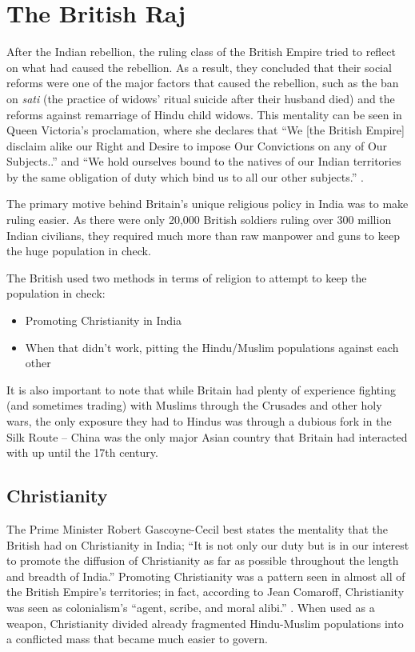 \documentclass[11pt, letterpaper]{article}
\begin{document}
\section{The British Raj}\label{the-british-raj}

After the Indian rebellion, the ruling class of the British Empire tried
to reflect on what had caused the rebellion. As a result, they concluded
that their social reforms were one of the major factors that caused the
rebellion, such as the ban on \emph{sati} (the practice of widows'
ritual suicide after their husband died) and the reforms against
remarriage of Hindu child widows. This mentality can be seen in Queen
Victoria's proclamation, where she declares that ``We {[}the British
Empire{]} disclaim alike our Right and Desire to impose Our Convictions
on any of Our Subjects..'' and ``We hold ourselves bound to the natives
of our Indian territories by the same obligation of duty which bind us
to all our other subjects.'' \cite{act1858}.

The primary motive behind Britain's unique religious policy in India was
to make ruling easier. As there were only 20,000 British soldiers ruling
over 300 million Indian civilians, they required much more than raw
manpower and guns to keep the huge population in check.

The British used two methods in terms of religion to attempt to keep the
population in check:

\begin{itemize}
\item
  Promoting Christianity in India
\item
  When that didn't work, pitting the Hindu/Muslim populations against
  each other
\end{itemize}

It is also important to note that while Britain had plenty of experience
fighting (and sometimes trading) with Muslims through the Crusades and
other holy wars, the only exposure they had to Hindus was through a
dubious fork in the Silk Route -- China was the only major Asian country
that Britain had interacted with up until the 17th century.

\subsection{Christianity}\label{christianity}

The Prime Minister Robert Gascoyne-Cecil best states the mentality that
the British had on Christianity in India; ``It is not only our duty but
is in our interest to promote the diffusion of Christianity as far as
possible throughout the length and breadth of India.'' \cite{kanjamala} Promoting
Christianity was a pattern seen in almost all of the British Empire's
territories; in fact, according to Jean Comaroff, Christianity was seen
as colonialism's ``agent, scribe, and moral alibi.'' \cite{comaroff}. When
used as a weapon, Christianity divided already fragmented Hindu-Muslim
populations into a conflicted mass that became much easier to govern.
\end{document}
